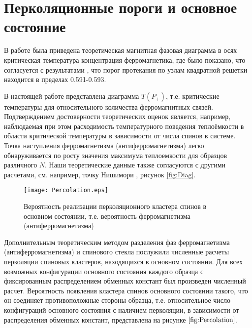


\section{Перколяционные пороги и основное состояние}
В работе \cite{belokon2006} была приведена теоретическая магнитная фазовая диаграмма в осях критическая температура-концентрация ферромагнетика, где было показано, что согласуется с результатами \cite{newman2000efficient, jacobsen2014high, jacobsen2015critical}, что порог протекания по узлам квадратной решетки находится в пределах 0.591-0.593.

В настоящей работе представлена диаграмма $T(P_+)$, т.е. критические температуры для относительного количества ферромагнитных связей. Подтверждением достоверности теоретических оценок является, например, наблюдаемая при этом  расходимость температурного поведения теплоёмкости в области критической температуры в зависимости от числа спинов в системе. Точка наступления ферромагнетизма (антиферромагнетизма) легко обнаруживается по росту значения максимума теплоемкости для образцов различного $N$. Наши теоретические данные также согласуются с другими расчетами, см. например, точку Нишимори \cite{nishimori1980exact}, рисунок \ref{fig:Diag}. 

\begin{figure}[!ht]
	\centering
	\texttt{[image: Percolation.eps]}
	\caption{Вероятность реализации перколяционного кластера спинов в основном состоянии, т.е. вероятность ферромагнетизма (антиферромагнетизма)}
	\label{fig:Percolation}
\end{figure}

Дополнительным теоретическим методом разделения фаз ферромагнетизма (антиферромагнетизма) и спинового стекла послужили численные расчеты перколяции спиновых кластеров, находящихся в основном состоянии. Для всех возможных конфигурации основного состояния каждого образца с фиксированным распределением обменных констант был произведен численный расчет. Вероятность появления кластера спинов основного состоянии такого, что он соединяет противоположные стороны образца, т.е. относительное число конфигураций основного состояния с наличием перколяции, в зависимости от распределения обменных констант, представлена на рисунке $\ref{fig:Percolation}$.  

